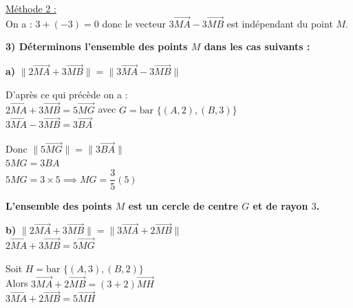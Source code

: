 \documentclass{article}
\begin{document}
\noindent \underline{Méthode 2 :} \\
On a : $3 + (-3) = 0$ donc le vecteur $3\overrightarrow{MA} - 3\overrightarrow{MB}$ est indépendant du point $M$.

\vspace{1.5em}

\noindent \textbf{3) Déterminons l'ensemble des points $M$ dans les cas suivants :}

\vspace{1em}

\noindent \textbf{a)} $\| 2\overrightarrow{MA} + 3\overrightarrow{MB} \| = \| 3\overrightarrow{MA} - 3\overrightarrow{MB} \|$

\vspace{1em}

\noindent D'après ce qui précède on a : \\
$2\overrightarrow{MA} + 3\overrightarrow{MB} = 5\overrightarrow{MG}$ avec $G = \text{bar } \{(A, 2), (B, 3)\}$ \\
$3\overrightarrow{MA} - 3\overrightarrow{MB} = 3\overrightarrow{BA}$

\vspace{1em}

\noindent Donc $\| 5\overrightarrow{MG} \| = \| 3\overrightarrow{BA} \|$ \\
\phantom{Donc} $5MG = 3BA$ \\
\phantom{Donc} $5MG = 3 \times 5 \implies MG = \dfrac{3}{5}(5)$ \\
\phantom{Donc} 

\vspace{1.5em}

\noindent \textbf{L'ensemble des points $M$ est un cercle de centre $G$ et de rayon $3$.}

\vspace{2em}

\noindent \textbf{b)} $\| 2\overrightarrow{MA} + 3\overrightarrow{MB} \| = \| 3\overrightarrow{MA} + 2\overrightarrow{MB} \|$ \\
$2\overrightarrow{MA} + 3\overrightarrow{MB} = 5\overrightarrow{MG}$

\noindent Soit $H = \text{bar } \{(A, 3), (B, 2)\}$ \\
Alors $3 \overrightarrow{MA} + 2 \overrightarrow{MB} = (3 + 2) \overrightarrow{MH}$ \\
\phantom{Alors} $3 \overrightarrow{MA} + 2 \overrightarrow{MB} = 5 \overrightarrow{MH}$

\vspace{1em}
\end{document}
